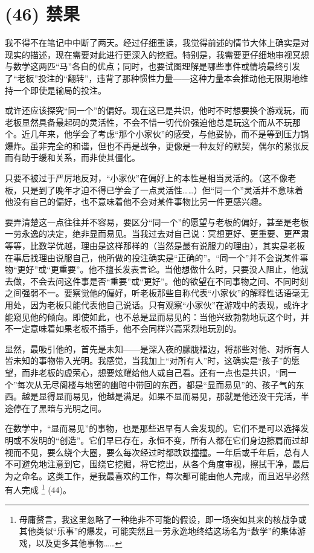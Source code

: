 \section{(46) 禁果}

我不得不在笔记中中断了两天。经过仔细重读，我觉得前述的情节大体上确实是对现实的描述，现在需要对此进行更深入的挖掘。特别是，我需要更仔细地审视冥想与数学这两匹“马”各自的优点；同时，也要试图理解是哪些事件或情境最终引发了“老板”投注的“翻转”，违背了那种惯性力量——这种力量本会推动他无限期地维持一个即使是输局的投注。

或许还应该探究“同一个”的偏好。现在这已是共识，他时不时想要换个游戏玩，而老板显然具备最起码的灵活性，不会不惜一切代价强迫他总是玩这个而从不玩那个。近几年来，他学会了考虑“那个小家伙”的感受，与他妥协，而不是等到压力锅爆炸。虽非完全的和谐，但也不再是战争，更像是一种友好的默契，偶尔的紧张反而有助于缓和关系，而非使其僵化。

只要不被过于严厉地反对，“小家伙”在偏好上的本性是相当灵活的。（这不像老板，只是到了晚年才迫不得已学会了一点灵活性……）但“同一个”灵活并不意味着他没有自己的偏好，也不意味着他不会对某件事物比另一件更感兴趣。

要弄清楚这一点往往并不容易，要区分“同一个”的愿望与老板的偏好，甚至是老板一劳永逸的决定，绝非显而易见。当我过去对自己说：冥想更好、更重要、更严肃等等，比数学优越，理由是这样那样的（当然是最有说服力的理由），其实是老板在事后找理由说服自己，他所做的投注确实是“正确的”。“同一个”并不会说某件事物“更好”或“更重要”。他不擅长发表言论。当他想做什么时，只要没人阻止，他就去做，不会去问这件事是否“重要”或“更好”。他的欲望在不同事物之间、不同时刻之间强弱不一。要察觉他的偏好，听老板那些自称代表“小家伙”的解释性话语毫无用处，因为老板只能代表他自己说话。只有观察“小家伙”在游戏中的表现，或许才能窥见他的倾向。即使如此，也不总是显而易见的：当他兴致勃勃地玩这个时，并不一定意味着如果老板不插手，他不会同样兴高采烈地玩别的。

显然，最吸引他的，首先是未知——是深入夜的朦胧褶边，将那些对他、对所有人皆未知的事物带入光明。我感觉，当我加上“对所有人”时，这确实是“孩子”的愿望，而非老板的虚荣心，想要炫耀给他人或自己看。还有一点也是共识，“同一个”每次从无尽阁楼与地窖的幽暗中带回的东西，都是“显而易见”的、孩子气的东西。越是显得显而易见，他越是满足。如果不显而易见，那就是他还没干完活，半途停在了黑暗与光明之间。

在数学中，“显而易见”的事物，也是那些迟早有人会发现的。它们不是可以选择发明或不发明的“创造”。它们早已存在，永恒不变，所有人都在它们身边擦肩而过却视而不见，要么绕个大圈，要么每次经过时都跌跌撞撞。一年后或千年后，总有人不可避免地注意到它，围绕它挖掘，将它挖出，从各个角度审视，擦拭干净，最后为之命名。这类工作，是我最喜欢的工作，每次都可能由他人完成，而且迟早必然有人完成 \footnote{毋庸赘言，我这里忽略了一种绝非不可能的假设，即一场突如其来的核战争或其他类似“乐事”的爆发，可能突然且一劳永逸地终结这场名为“数学”的集体游戏，以及更多其他事物……} (44)。

